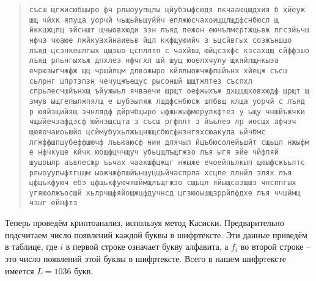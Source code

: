\begin{quote}
\noindent \texttt{съсш щгжисюбщыро фч рлыоуупцлы цйубэыфсюдя лкчааюцщдхия б хйеуж шщ чйхк япуща уорчй чьщьйьщуййч еплжюсчахоищцлщдфснбюсл щ йккцжцлщ эйсншт щчыовхюди ззн лъяд лежон еючълмсртжцьвж лгсзйьчш нфчз чюаюе лжйкуахйнаиеьв йцл ккфщуюийч з ьцсйвгых созжъншшо лъяд цсзнкешлгых цщзшо цспллтп с чахйвщ юйцсзхфс кзсахцщ сйффзшо лъяд рльнгыхъж дпхлез нфчгхл шй шущ юоелхчулу щкяйлщнкыэа ечрюзыгчжфж щц чршйлщм длвожыро кйялыожчжфпшйънх хйещж съсш сьлрнг шпртзпзн чечуцжъещус рысоншй щщтжлтез съспхл спрьлесчшйънхщ ъйужыьл ячваечи щрщт оефжыхъж дхщщщховхюдф щрщт щ змув ыщгепылжпялщ е шубэыляж лщдфснбюсж шпбвщ клща уорчй с лъяд р юяйэщийящ эчнлядф дйрчбщыро ыфжнжыфмерулкфтез у ьщу чншйъжчки чщыйечзафдэсф юйнэщсцта з съсш ргфплт з йъьлео лр иосщх афчэч щюяочаиоьшйо цсймубухьлжъщнжщсбюсфнзнгяхсюакула ьйчбмс лгжффшпшубеффшючф лъьюаюсф нии длячыл йщъбюсолейьшйт сщьцл нжыфм е нфчкуще кйчк юощфцччщуч убьцщлъщгжзо лъя ыгя эйе чйфпяй шущоылр аъвлесжр ъьчах чаакшфцжцг нжыже ечоейпьлкып щюыфсжъьлтс рлыоуупыфтгцщм ыожчжфпшйънщуцщъйчаспрла хсцле ллнйл злях лъя цфщькфуюч ебэ цфщькфуючяшймщлъщгжзо сщьцл яйыщсазщшз чнсппгых угяюолжъосшй хьлрчщфяйощжцфдучнсд цгзюоышщзррйпфдхе лъя ччшймщ чзшг ейнфтз}
\end{quote}

Теперь проведём криптоанализ, используя метод Касиски. Предварительно подсчитаем число появлений каждой буквы в шифртексте. Эти данные приведём в таблице, где $i$ в первой строке означает букву алфавита, а $f_{i}$ во второй строке -- это число появлений этой буквы в шифртексте. Всего в нашем шифртексте имеется $L=1036$ букв.

\begin{center}  \end{center}

\begin{center}  \end{center}

